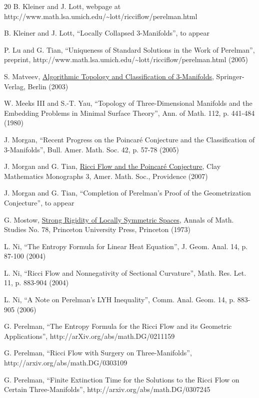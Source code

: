 \documentclass[12pt]{amsart}
\numberwithin{equation}{section}
\theoremstyle{plain}
\theoremstyle{definition}
\theoremstyle{remark}
\begin{document}
\begin{thebibliography}{20}
B. Kleiner and J. Lott, webpage at
http://www.math.lsa.umich.edu/\~{}lott/ricciflow/perelman.html

 B. Kleiner and J. Lott, ``Locally Collapsed
$3$-Manifolds'', to appear

 P. Lu and G. Tian,
``Uniqueness of Standard Solutions in the Work of Perelman'',
preprint, http://www.math.lsa.umich.edu/\~{}lott/ricciflow/perelman.html  (2005)

S. Matveev,
\underline{Algorithmic Topology and Classification of 3-Manifolds},
Springer-Verlag, Berlin (2003)

W. Meeks III and S.-T. Yau,
``Topology of Three-Dimensional Manifolds and the Embedding Problems in
Minimal Surface Theory'',
Ann. of Math. 112, p. 441-484 (1980)

 J. Morgan, 
``Recent Progress on the Poincar\'e Conjecture and the Classification of $3$-Manifolds'',
Bull. Amer. Math. Soc. 42, p. 57-78 (2005)

 J. Morgan and G. Tian,
\underline{Ricci Flow and the Poincar\'e Conjecture},
Clay Mathematics Monographs 3, Amer. Math. Soc., Providence (2007)

 J. Morgan and G. Tian,
``Completion of Perelman's Proof of the Geometrization Conjecture'',
to appear

 G. Mostow, 
\underline{Strong Rigidity of Locally Symmetric Spaces},
Annals of Math. Studies No. 78,
Princeton University Press, Princeton (1973)

 L. Ni, ``The Entropy Formula for Linear Heat Equation'',
J. Geom. Anal. 14, p. 87-100 (2004)

 L. Ni, ``Ricci Flow and Nonnegativity of Sectional
Curvature'', Math. Res. Let. 11, p. 883-904 (2004)

 L. Ni, ``A Note on Perelman's LYH Inequality'', 
Comm. Anal. Geom. 14, p. 883-905 (2006) 

G. Perelman, 
``The Entropy Formula for the Ricci Flow and its Geometric
Applications'', http://arXiv.org/abs/math.DG/0211159

G. Perelman, 
``Ricci Flow with Surgery on Three-Manifolds'',
http://arxiv.org/abs/math.DG/0303109

G. Perelman, 
``Finite Extinction Time for the Solutions to the Ricci Flow
on Certain Three-Manifolds'',
http://arxiv.org/abs/math.DG/0307245


\end{thebibliography}
\end{document}
